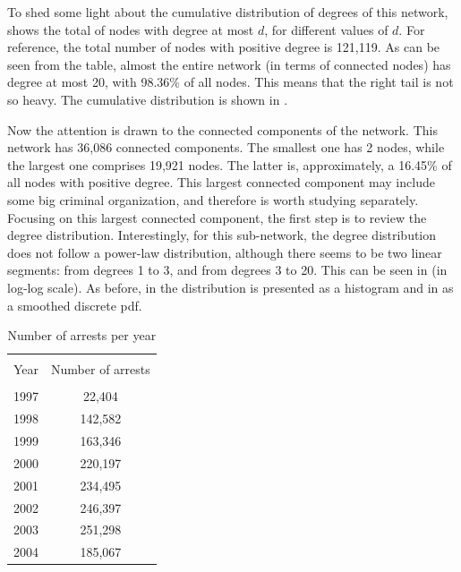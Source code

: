 \documentclass[11pt, english]{article}
\begin{document}
\begin{multicols}{2}
To shed some light about the cumulative distribution of degrees of this network,  shows the total of nodes with degree at most $d$, for different values of $d$. For reference, the total number of nodes with positive degree is 121,119. As can be seen from the table, almost the entire network (in terms of connected nodes) has degree at most 20, with 98.36\% of all nodes. This means that the right tail is not so heavy. The cumulative distribution is shown in .

Now the attention is drawn to the connected components of the network. This network has 36,086 connected components. The smallest one has 2 nodes, while the largest one comprises 19,921 nodes. The latter is, approximately, a 16.45\% of all nodes with positive degree. This largest connected component may include some big criminal organization, and therefore is worth studying separately. Focusing on this largest connected component, the first step is to review the degree distribution. Interestingly, for this sub-network, the degree distribution does not follow a power-law distribution, although there seems to be two linear segments: from degrees 1 to 3, and from degrees 3 to 20. This can be seen in  (in log-log scale). As before, in  the distribution is presented as a histogram and in  as a smoothed discrete pdf. 

\begin{table}
	\caption{Number of arrests per year}
	\label{tab:crimes-per-year}
	\centering
	\begin{tabular}{cc}
		\hline\hline
		\\[-1.5ex]
		Year	&	Number of arrests	\\[0.5ex]\hline
		\\[-1.5ex]
		1997	&	\hspace{1ex}22,404	\\[0.2ex]
		1998	&	142,582				\\[0.2ex]
		1999	&	163,346				\\[0.2ex]
		2000	&	220,197				\\[0.2ex]
		2001	&	234,495				\\[0.2ex]
		2002	&	246,397				\\[0.2ex]
		2003	&	251,298				\\[0.2ex]
		2004	&	185,067				\\[0.5ex]
		\hline\hline
	\end{tabular}
	


\end{table}
\end{multicols}
\end{document}
